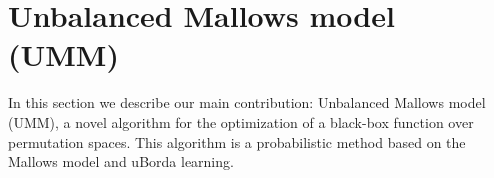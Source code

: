 \documentclass[runningheads]{llncs}
\begin{document}
\renewcommand{\subsubsection}[1]{\smallskip{}\noindent\textbf{#1}.}



\section{Unbalanced Mallows model (UMM)}\label{sec:umm}




In this section we describe our main contribution: Unbalanced Mallows model
(UMM), a novel algorithm for the optimization of a black-box function over
permutation spaces. This algorithm is a probabilistic method based on the
Mallows model and uBorda learning.
\end{document}
